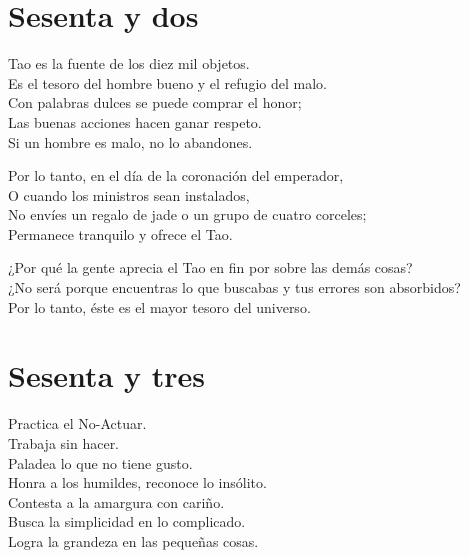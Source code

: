 \documentclass[hidelinks]{memoir}
\begin{document}
	\chapter*{Sesenta y dos}
	
	Tao es la fuente de los diez mil objetos.\\
	Es el tesoro del hombre bueno y el refugio del malo.\\
	Con palabras dulces se puede comprar el honor;\\
	Las buenas acciones hacen ganar respeto.\\
	Si un hombre es malo, no lo abandones.
	
	Por lo tanto, en el día de la coronación del emperador,\\
	O cuando los ministros sean instalados,\\
	No envíes un regalo de jade o un grupo de cuatro corceles;\\
	Permanece tranquilo y ofrece el Tao.
	
	¿Por qué la gente aprecia el Tao en fin por sobre las demás cosas?\\
	¿No será porque encuentras lo que buscabas y tus errores son
	absorbidos?\\
	Por lo tanto, éste es el mayor tesoro del universo.
	
	\chapter*{Sesenta y tres}
	
	Practica el No-Actuar.\\
	Trabaja sin hacer.\\
	Paladea lo que no tiene gusto.\\
	Honra a los humildes, reconoce lo insólito.\\
	Contesta a la amargura con cariño.\\
	Busca la simplicidad en lo complicado.\\
	Logra la grandeza en las pequeñas cosas.
	
\end{document}
